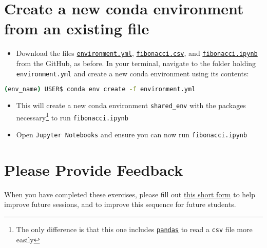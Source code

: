 \documentclass[10pt]{article}
\begin{document}
\section{Create a new conda environment from an existing file}

\begin{itemize}
	\item Download the files \href{https://github.com/m-needham/first_year_programming_sequence/blob/main/1_conda_jupyter/environment.yml}{\lstinline|environment.yml|}, \href{https://github.com/m-needham/first_year_programming_sequence/blob/main/1_conda_jupyter/fibonacci.csv}{\lstinline|fibonacci.csv|}, and \href{https://github.com/m-needham/first_year_programming_sequence/blob/main/1_conda_jupyter/fibonacci.ipynb}{\lstinline|fibonacci.ipynb|} from the GitHub, as before. In your terminal, navigate to the folder holding \lstinline|environment.yml| and create a new conda environment using its contents: 
\end{itemize}


\begin{lstlisting}[language=bash]
	(env_name) USER$ conda env create -f environment.yml 
\end{lstlisting}

\begin{itemize}
	\item This will create a new conda environment \lstinline|shared_env| with the packages necessary\footnote{The only difference is that this one includes \href{https://pandas.pydata.org/}{\lstinline|pandas|} to read a \lstinline|csv| file more easily} to run \lstinline|fibonacci.ipynb|
	\item Open \lstinline|Jupyter Notebooks| and ensure you can now run \lstinline|fibonacci.ipynb|
\end{itemize}

\section*{Please Provide Feedback}

\noindent
When you have completed these exercises, please fill out \href{https://docs.google.com/forms/d/e/1FAIpQLSeI7AFmrkYJcXbn8JIr7SykxDZZkMWlTXzY5kDd_-F71HgFSg/viewform?usp=sf_link}{this short form} to help improve future sessions, and to improve this sequence for future students.
	
\end{document}
